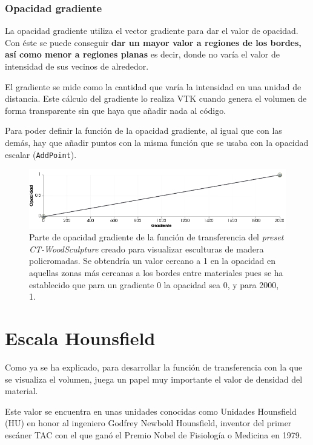 \subsubsection{Opacidad gradiente}

La opacidad gradiente utiliza el vector gradiente para dar el valor de opacidad. Con éste se puede conseguir \textbf{dar un mayor valor a regiones de los bordes, así como menor a regiones planas} es decir, donde no varía el valor de intensidad de sus vecinos de alrededor.

El gradiente se mide como la cantidad que varía la intensidad en una unidad de distancia. Este cálculo del gradiente lo realiza VTK cuando genera el volumen de forma transparente sin que haya que añadir nada al código.

Para poder definir la función de la opacidad gradiente, al igual que con las demás, hay que añadir puntos con la misma función que se usaba con la opacidad escalar (\texttt{AddPoint}). 

\begin{figure}[H]
	\centering
	\includegraphics[width=12.5cm]{imagenes/gradient_tf}
	\caption{Parte de opacidad gradiente de la función de transferencia del \textit{preset} \textit{CT-WoodSculpture} creado para visualizar esculturas de madera policromadas. Se obtendría un valor cercano a 1 en la opacidad en aquellas zonas más cercanas a los bordes entre materiales pues se ha establecido que para un gradiente 0 la opacidad sea 0, y para 2000, 1. }
	\label{fig:gradient_tf}
\end{figure}

\section{Escala Hounsfield}

Como ya se ha explicado, para desarrollar la función de transferencia con la que se visualiza el volumen, juega un papel muy importante el valor de densidad del material. 

Este valor se encuentra en unas unidades conocidas como Unidades Hounsfield (HU) en honor al ingeniero Godfrey Newbold Hounsfield, inventor del primer escáner TAC con el que ganó el Premio Nobel de Fisiología o Medicina en 1979.


